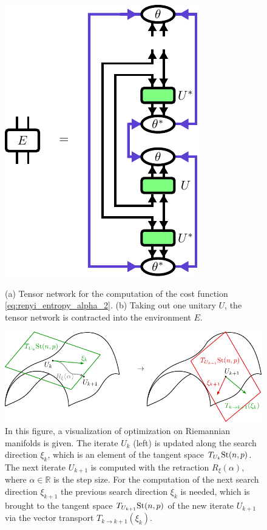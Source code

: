 \begin{figure}
{		\includegraphics[scale=1]{figures/tikz/disoTPS/evenbly_vidal_renyi_2/evenbly_vidal_renyi_2_b.pdf}
	}
	\caption{(a) Tensor network for the computation of the cost function \eqref{eq:renyi_entropy_alpha_2}. (b) Taking out one unitary $U$, the tensor network is contracted into the environment $E$.}
	\label{fig:disentangling_evenbly_vidal_algorithm}
\end{figure}
\begin{figure}
	\centering
	\includegraphics[scale=1]{figures/tikz/disoTPS/riemannian_optimization/riemannian_optimization.pdf}
	\caption{In this figure, a visualization of optimization on Riemannian manifolds is given. The iterate $U_k$ (left) is updated along the search direction $\xi_k$, which is an element of the tangent space $T_{U_k}\text{St}(n,p)$. The next iterate $U_{k+1}$ is computed with the retraction $R_\xi\left(\alpha\right)$, where $\alpha\in\mathbb{R}$ is the step size. For the computation of the next search direction $\xi_{k+1}$ the previous search direction $\xi_k$ is needed, which is brought to the tangent space $T_{U_{k+1}}\text{St}(n,p)$ of the new iterate $U_{k+1}$ via the vector transport $T_{k\rightarrow k+1}\left(\xi_k\right)$.}
	\label{fig:disentangling_riemannian_optimization}
\end{figure}
